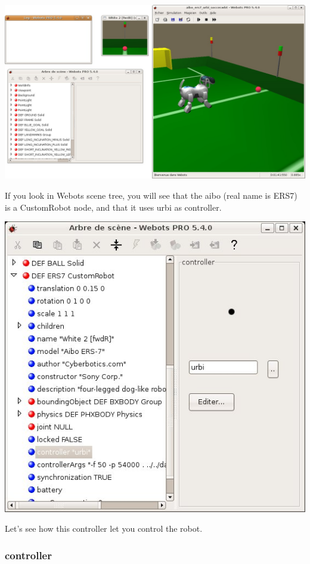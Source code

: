 \begin{center}
  \includegraphics[width=\linewidth]{img/webots/aibo-soccer}
\end{center}

If you look in Webots scene tree, you will see that the aibo (real
name is ERS7) is a CustomRobot node, and that it uses urbi as
controller.

\begin{center}
  \includegraphics[width=.8\linewidth]{img/webots/scene-tree}
\end{center}

Let's see how this controller let you control the robot.


\subsubsection{\urbi controller}
\label{webots.firstrun.urbicontroller}%

